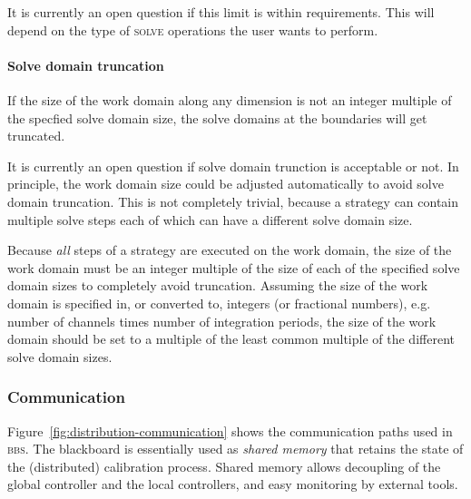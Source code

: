 \documentclass[10pt]{lofar}
\newcommand{\bbs}{\textsc{bbs}\xspace}
\newcommand{\solve}{\textsc{solve}\xspace}
\begin{document}
It is currently an open question if this limit is within requirements. This will
depend on the type of \solve operations the user wants to perform.

\paragraph{Solve domain truncation}

If the size of the work domain along any dimension is not an integer multiple of
the specfied solve domain size, the solve domains at the boundaries will get
truncated. 

It is currently an open question if solve domain trunction is acceptable or not.
In principle, the work domain size could be adjusted automatically to avoid
solve domain truncation. This is not completely trivial, because a strategy can
contain multiple solve steps each of which can have a different solve domain
size.

Because \emph{all} steps of a strategy are executed on the work domain, the size
of the work domain must be an integer multiple of the size of each of the
specified solve domain sizes to completely avoid truncation. Assuming the
size of the work domain is specified in, or converted to, integers (or
fractional numbers), e.g. number of channels times number of integration
periods, the size of the work domain should be set to a multiple of the least
common multiple of the different solve domain sizes.

\subsubsection{Communication}
\label{subsubsec:distribution-communication}

Figure~\ref{fig:distribution-communication} shows the communication paths used
in \bbs. The blackboard is essentially used as \emph{shared memory} that retains
the state of the (distributed) calibration process. Shared memory allows
decoupling of the global controller and the local controllers, and easy
monitoring by external tools.
\end{document}
